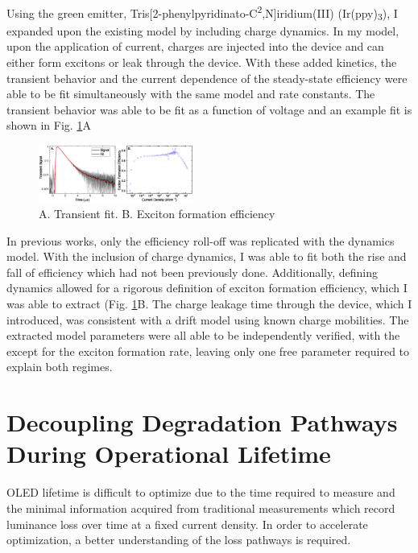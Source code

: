 \documentclass[a4paper,titlepage]{article}
\begin{document}
Using the green emitter, Tris[2-phenylpyridinato-C\textsuperscript{2},N]iridium(III) (Ir(ppy)\textsubscript{3}), I expanded upon the existing model by including charge dynamics.  In my model, upon the application of current, charges are injected into the device and can either form excitons or leak through the device.  With these added kinetics, the transient behavior and the current dependence of the steady-state efficiency were able to be fit simultaneously with the same model and rate constants.  The transient behavior was able to be fit as a function of voltage and an example fit is shown in Fig. \ref{unified}A

\begin{figure}
\vspace{-15pt}
\includegraphics[width=0.45\textwidth]{unified.eps}
\caption{A. Transient fit. B. Exciton formation efficiency}
\label{unified}
\vspace{-20pt}
\end{figure}

In previous works, only the efficiency roll-off was replicated with the dynamics model.  With the inclusion of charge dynamics, I was able to fit both the rise and fall of efficiency which had not been previously done.  Additionally, defining dynamics allowed for a rigorous definition of exciton formation efficiency, which I was able to extract (Fig. \ref{unified}B.  The charge leakage time through the device, which I introduced, was consistent with a drift model using known charge mobilities.  The extracted model parameters were all able to be independently verified, with the except for the exciton formation rate, leaving only one free parameter required to explain both regimes.

\section*{Decoupling Degradation Pathways During Operational Lifetime}

OLED lifetime is difficult to optimize due to the time required to measure and the minimal information acquired from traditional measurements which record luminance loss over time at a fixed current density.  In order to accelerate optimization, a better understanding of the loss pathways is required.  
\end{document}
